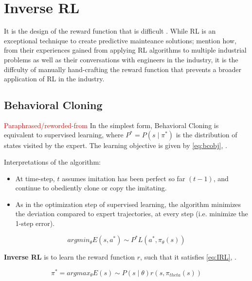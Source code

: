 \documentclass{article}
\begin{document}
	\section{Inverse RL}
	
	It is the design of the reward function that is difficult \citep{abbeel2004apprenticeship, ng2000algorithms}.
	While RL is an exceptional technique to create predictive mainteance solutions; \cite{abbeel2004apprenticeship} mention how, from their experiences gained from applying RL algorithms to multiple industrial problems as well as their conversations with engineers in the industry, it is the diffculty of manually hand-crafting the reward function that prevents a broader application of RL in the industry.
	
	
	\subsection{Behavioral Cloning} 
	\textcolor{red}{Paraphrased/reworded-from \cite{yue2018imitation}}
	In the simplest form, Behavioral Cloning is equivalent to supervised learning, where $P^* = P(s\mid\pi^*)$ is the distribution of states visited by the expert. The learning objective is given by \ref{eq:bcobj}, \cite{yue2018imitation}. 
	
	Interpretations of the algorithm:
	\begin{itemize}
		\item At time-step, $t$ assumes imitation has been perfect so far $(t-1)$, and continue to obediently clone or copy the imitating.
		\item As in the optimization step of supervised learning, the algorithm minimizes the deviation compared to expert trajectories, at every step (i.e. minimize the 1-step error).
	\end{itemize}
	
	
	\begin{equation}\label{eq:bcobj}
		argmin_\theta E(s,a^*) \sim P^* L(a^*, \pi_{\theta}(s))	
	\end{equation}
	
	
	\textbf{Inverse RL} is to learn the reward function $r$, such that it satisfies \ref{eq:IRL}, \cite{yue2018imitation}.
	
	\begin{equation}\label{eq:IRL}
		\pi^* = argmax_\theta E(s) \sim P(s\mid\theta)r(s,\pi_{theta}(s))
	\end{equation}
	
\end{document}
